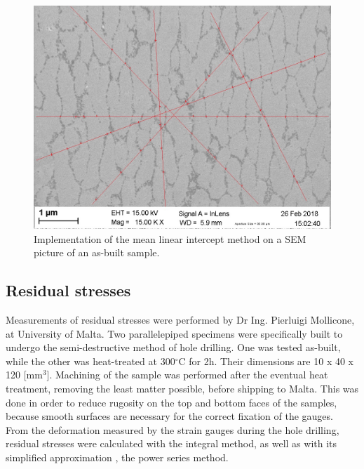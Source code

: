 \begin{figure}[h]
	\centering
	\centerline{\includegraphics[scale=0.50]{Images/SEM-7b-7}}
	\decoRule
	\caption[Implementation of the mean linear intercept method on a SEM picture of an as-built sample.]{Implementation of the mean linear intercept method on a SEM picture of an as-built sample.}
	\label{fig:mm_sem}
\end{figure}

\subsection{Residual stresses}

Measurements of residual stresses were performed by Dr Ing. Pierluigi Mollicone, at University of Malta. Two parallelepiped specimens were specifically built to undergo the semi-destructive method of hole drilling. One was tested as-built, while the other was heat-treated at 300$^\circ$C for 2h. Their dimensions are 10 x 40 x 120 [mm$^3$]. Machining of the sample was performed after the eventual heat treatment, removing the least matter possible, before shipping to Malta. This was done in order to reduce rugosity on the top and bottom faces of the samples, because smooth surfaces are necessary for the correct fixation of the gauges. \\

From the deformation measured by the strain gauges during the hole drilling, residual stresses were calculated with the integral method, as well as with its simplified approximation \cite{Trebuna08}, the power series method.\\

